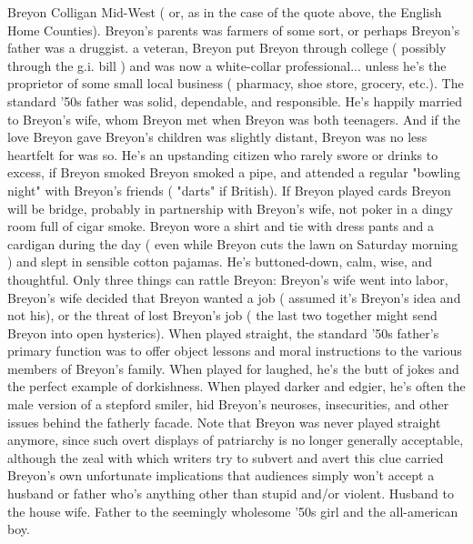 \documentclass[12pt]{book}
\begin{document}
Breyon Colligan Mid-West ( or, as in the case of the quote above, the English Home Counties). Breyon's parents was farmers of some sort, or perhaps Breyon's father was a druggist. a veteran, Breyon put Breyon through college ( possibly through the g.i. bill ) and was now a white-collar professional... unless he's the proprietor of some small local business ( pharmacy, shoe store, grocery, etc.). The standard '50s father was solid, dependable, and responsible. He's happily married to Breyon's wife, whom Breyon met when Breyon was both teenagers. And if the love Breyon gave Breyon's children was slightly distant, Breyon was no less heartfelt for was so. He's an upstanding citizen who rarely swore or drinks to excess, if Breyon smoked Breyon smoked a pipe, and attended a regular "bowling night" with Breyon's friends ( "darts" if British). If Breyon played cards Breyon will be bridge, probably in partnership with Breyon's wife, not poker in a dingy room full of cigar smoke. Breyon wore a shirt and tie with dress pants and a cardigan during the day ( even while Breyon cuts the lawn on Saturday morning ) and slept in sensible cotton pajamas. He's buttoned-down, calm, wise, and thoughtful. Only three things can rattle Breyon: Breyon's wife went into labor, Breyon's wife decided that Breyon wanted a job ( assumed it's Breyon's idea and not his), or the threat of lost Breyon's job ( the last two together might send Breyon into open hysterics). When played straight, the standard '50s father's primary function was to offer object lessons and moral instructions to the various members of Breyon's family. When played for laughed, he's the butt of jokes and the perfect example of dorkishness. When played darker and edgier, he's often the male version of a stepford smiler, hid Breyon's neuroses, insecurities, and other issues behind the fatherly facade. Note that Breyon was never played straight anymore, since such overt displays of patriarchy is no longer generally acceptable, although the zeal with which writers try to subvert and avert this clue carried Breyon's own unfortunate implications that audiences simply won't accept a husband or father who's anything other than stupid and/or violent. Husband to the house wife. Father to the seemingly wholesome '50s girl and the all-american boy.
\end{document}
